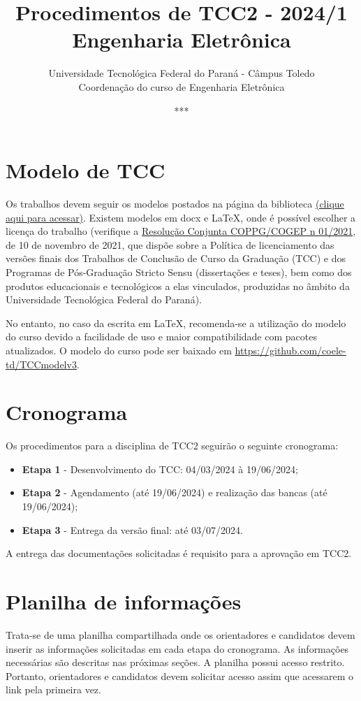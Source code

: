 \documentclass[a4paper, 12pt]{article}
\title{Procedimentos de TCC2 - 2024/1\\\textbf{Engenharia Eletrônica}}
\date{***}
\author{Universidade Tecnológica Federal do Paraná - Câmpus Toledo\\Coordenação do curso de Engenharia Eletrônica}
\newcommand{\startdate}{04/03/2024}		%
\newcommand{\agendadate}{19/06/2024}	%
\newcommand{\finaldate}{03/07/2024}		%
\begin{document}
    \maketitle
    
    \section{Modelo de TCC}
    Os trabalhos devem seguir os modelos postados na página da biblioteca \href{http://portal.utfpr.edu.br/biblioteca/trabalhos-academicos}{(clique aqui para acessar)}. Existem modelos em docx e \LaTeX, onde é possível escolher a licença do trabalho (verifique a \href{https://sei.utfpr.edu.br/sei/publicacoes/controlador_publicacoes.php?acao=publicacao_visualizar&id_documento=2615190&id_orgao_publicacao=0}{Resolução Conjunta COPPG/COGEP n\textordmasculine{} 01/2021}, de 10 de novembro de 2021, que dispõe sobre a Política de licenciamento das versões finais dos Trabalhos de Conclusão de Curso da Graduação (TCC) e dos Programas de Pós-Graduação Stricto Sensu (dissertações e teses), bem como dos produtos educacionais e tecnológicos a elas vinculados, produzidas no âmbito da Universidade Tecnológica Federal do Paraná).

	No entanto, no caso da escrita em \LaTeX{}, recomenda-se a utilização do modelo do curso devido a facilidade de uso e maior compatibilidade com pacotes atualizados. O modelo do curso pode ser baixado em \url{https://github.com/coele-td/TCCmodelv3}.
    
    \section{Cronograma}
    \label{sec:CRO}
    
    Os procedimentos para a disciplina de TCC2 seguirão o seguinte cronograma:
    \begin{itemize}
    	\item \textbf{Etapa 1} - Desenvolvimento do TCC: \startdate{} à \agendadate;
    	\item \textbf{Etapa 2} - Agendamento (até \agendadate) e realização das bancas (até \agendadate);
    	\item \textbf{Etapa 3} - Entrega da versão final: até \finaldate.    	
    \end{itemize}

	A entrega das documentações solicitadas é requisito para a aprovação em TCC2.

	\section{Planilha de informações}
	\label{sec:pla}
	Trata-se de uma planilha compartilhada onde os orientadores e candidatos devem inserir as informações solicitadas em cada etapa do cronograma. As informações necessárias são descritas nas próximas seções. A planilha possui acesso restrito. Portanto, orientadores e candidatos devem solicitar acesso assim que acessarem o link pela primeira vez.
	
\end{document}

